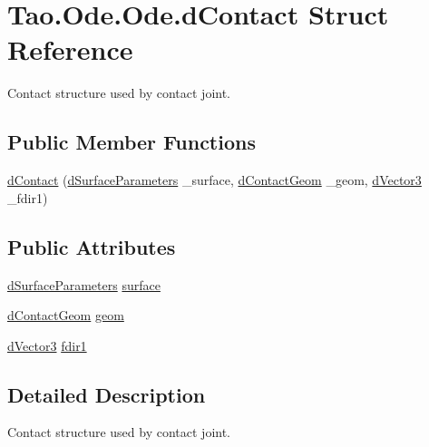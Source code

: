 \hypertarget{struct_tao_1_1_ode_1_1_ode_1_1d_contact}{
\section{Tao.Ode.Ode.dContact Struct Reference}
\label{struct_tao_1_1_ode_1_1_ode_1_1d_contact}
}


Contact structure used by contact joint.  


\subsection*{Public Member Functions}
\begin{DoxyCompactItemize}
\item 
\hyperlink{struct_tao_1_1_ode_1_1_ode_1_1d_contact_a6a3eb97657b7442fa5c97d0b962562d1}{dContact} (\hyperlink{struct_tao_1_1_ode_1_1_ode_1_1d_surface_parameters}{dSurfaceParameters} \_\-surface, \hyperlink{struct_tao_1_1_ode_1_1_ode_1_1d_contact_geom}{dContactGeom} \_\-geom, \hyperlink{struct_tao_1_1_ode_1_1_ode_1_1d_vector3}{dVector3} \_\-fdir1)
\end{DoxyCompactItemize}
\subsection*{Public Attributes}
\begin{DoxyCompactItemize}
\item 
\hyperlink{struct_tao_1_1_ode_1_1_ode_1_1d_surface_parameters}{dSurfaceParameters} \hyperlink{struct_tao_1_1_ode_1_1_ode_1_1d_contact_ae6cfbeedf3d62cb5fb337ea1d1cdd9a9}{surface}
\item 
\hyperlink{struct_tao_1_1_ode_1_1_ode_1_1d_contact_geom}{dContactGeom} \hyperlink{struct_tao_1_1_ode_1_1_ode_1_1d_contact_a7081f3f7eb7e987af8010801ecc2e4e9}{geom}
\item 
\hyperlink{struct_tao_1_1_ode_1_1_ode_1_1d_vector3}{dVector3} \hyperlink{struct_tao_1_1_ode_1_1_ode_1_1d_contact_aff7a9dcecef660266b5c04a972e3eac1}{fdir1}
\end{DoxyCompactItemize}


\subsection{Detailed Description}
Contact structure used by contact joint. 

